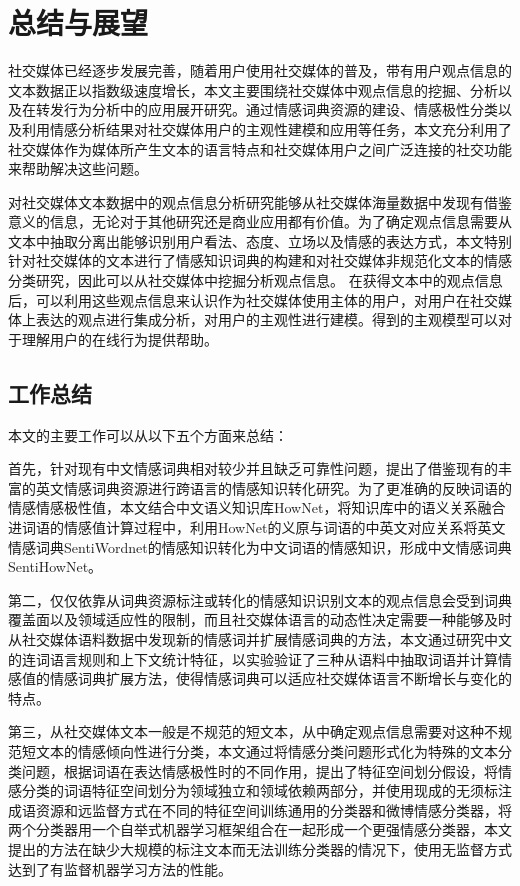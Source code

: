 \chapter{总结与展望}
\label{con}
社交媒体已经逐步发展完善，随着用户使用社交媒体的普及，带有用户观点信息的文本数据正以指数级速度增长，本文主要围绕社交媒体中观点信息的挖掘、分析以及在转发行为分析中的应用展开研究。通过情感词典资源的建设、情感极性分类以及利用情感分析结果对社交媒体用户的主观性建模和应用等任务，本文充分利用了社交媒体作为媒体所产生文本的语言特点和社交媒体用户之间广泛连接的社交功能来帮助解决这些问题。

对社交媒体文本数据中的观点信息分析研究能够从社交媒体海量数据中发现有借鉴意义的信息，无论对于其他研究还是商业应用都有价值。为了确定观点信息需要从文本中抽取分离出能够识别用户看法、态度、立场以及情感的表达方式，本文特别针对社交媒体的文本进行了情感知识词典的构建和对社交媒体非规范化文本的情感分类研究，因此可以从社交媒体中挖掘分析观点信息。
在获得文本中的观点信息后，可以利用这些观点信息来认识作为社交媒体使用主体的用户，对用户在社交媒体上表达的观点进行集成分析，对用户的主观性进行建模。得到的主观模型可以对于理解用户的在线行为提供帮助。

\section{工作总结}

本文的主要工作可以从以下五个方面来总结：

首先，针对现有中文情感词典相对较少并且缺乏可靠性问题，提出了借鉴现有的丰富的英文情感词典资源进行跨语言的情感知识转化研究。为了更准确的反映词语的情感情感极性值，本文结合中文语义知识库HowNet，将知识库中的语义关系融合进词语的情感值计算过程中，利用HowNet的义原与词语的中英文对应关系将英文情感词典SentiWordnet的情感知识转化为中文词语的情感知识，形成中文情感词典SentiHowNet。

第二，仅仅依靠从词典资源标注或转化的情感知识识别文本的观点信息会受到词典覆盖面以及领域适应性的限制，而且社交媒体语言的动态性决定需要一种能够及时从社交媒体语料数据中发现新的情感词并扩展情感词典的方法，本文通过研究中文的连词语言规则和上下文统计特征，以实验验证了三种从语料中抽取词语并计算情感值的情感词典扩展方法，使得情感词典可以适应社交媒体语言不断增长与变化的特点。

第三，从社交媒体文本一般是不规范的短文本，从中确定观点信息需要对这种不规范短文本的情感倾向性进行分类，本文通过将情感分类问题形式化为特殊的文本分类问题，根据词语在表达情感极性时的不同作用，提出了特征空间划分假设，将情感分类的词语特征空间划分为领域独立和领域依赖两部分，并使用现成的无须标注成语资源和远监督方式在不同的特征空间训练通用的分类器和微博情感分类器，将两个分类器用一个自举式机器学习框架组合在一起形成一个更强情感分类器，本文提出的方法在缺少大规模的标注文本而无法训练分类器的情况下，使用无监督方式达到了有监督机器学习方法的性能。

